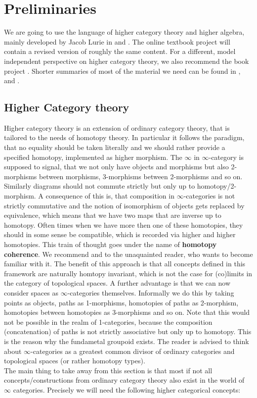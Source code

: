 \chapter{Preliminaries}
We are going to use the language of higher category theory and higher algebra, mainly developed by Jacob Lurie in \cite{HigherToposTheory} and \cite{lurie2017higher}. 
The online textbook project \cite{kerodon} will contain a revised version of roughly the same content. For a different, model independent perspective on higher category theory, we also recommend the book project \cite{RiehlVerityElements}.
 Shorter summaries of most of the material we need can be found in \cite{Grothshortcourse}, \cite{camarena2013whirlwind} and \cite{Gepnerintroductionhigher}.
\section{Higher Category theory}
Higher category theory is an extension of ordinary category theory, that is tailored to the needs of homotopy theory. In particular it follows the paradigm, that no equality should be taken literally and we should rather provide a specified homotopy, implemented as higher morphism. The $\infty$ in $\infty$-category is supposed to signal, that we not only have objects and morphisms but also 2-morphisms between morphisms, 3-morphisms between 2-morphisms and so on. Similarly diagrams should not commute strictly but only up to homotopy/2-morphism. A consequence of this is, that composition in $\infty$-categories is not strictly commutative and the notion of isomorphism of objects gets replaced by equivalence, which means that we have two maps that are inverse up to homotopy. Often times when we have more then one of these homotopies, they should in some sense be compatible, which is recorded via higher and higher homotopies. This train of thought goes under the name of  \textbf{homotopy coherence}. We recommend \cite{riehl2018homotopy} and \cite[Section~1.2.6]{HigherToposTheory} to the unaquainted reader, who wants  to become familiar with it. The benefit of this approach is that all concepts defined in this framework are naturally homtopy invariant, which is not the case for (co)limits in the category of topological spaces. A further advantage is that we can now consider spaces as $\infty$-categories themselves. Informally we do this by taking points as objects, paths as 1-morphisms, homotopies of paths as 2-morphism, homotopies between homotopies as 3-morphisms and so on. Note that this would not be possible in the realm of 1-categories, because the composition (concatenation) of paths is not strictly associative but only up to homotopy. This is the reason why the fundametal groupoid exists. The reader is advised to think about $\infty$-categories as a greatest common divisor of ordinary categories and topological spaces (or rather homotopy types).\\
The main thing to take away from this section is that most if not all concepts/constructions from ordinary category theory also exist in the world of $\infty$ categories.
Precisely we will need the following higher categorical concepts:


